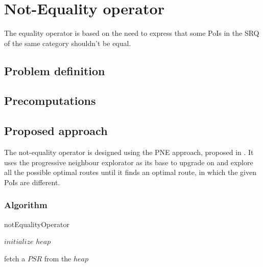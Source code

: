 \section{Not-Equality operator}
The equality operator is based on the need to express that some PoIs in the SRQ of the same category shouldn't be equal.

\subsection{Problem definition} 
\label{sec:problem}

\subsection{Precomputations} 
\label{sec:precomp}

\subsection{Proposed approach} 
\label{sec:approach}
The not-equality operator is designed using the PNE approach, proposed in \cite{OSR}. It uses the progressive neighbour explorator as its base to upgrade on and explore all the possible optimal routes until it finds an optimal route, in which the given PoIs are different.

\subsubsection{Algorithm}
\label{sec:algortihm}



\begin{algorithm}
	\label{notequality}
	\caption{notEqualityOperator}
	
	\BlankLine
	
	$initialize$ $heap$\; 
	
	
	fetch a $PSR$ from the $heap$\;
	
	
\end{algorithm}

